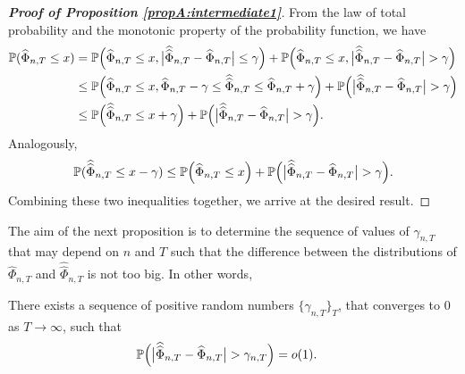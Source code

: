 \documentclass[a4paper,12pt]{article}
\newcommand{\doublehattwo}[1]{\widehat{\widehat{#1}}}
\begin{document}
\begin{proof}[\textnormal{\textbf{Proof of Proposition \ref{propA:intermediate1}}}] 
From the law of total probability and the monotonic property of the probability function, we have
\begin{align*} \pr(\widehat{\Phi}_{n, T} \le x) &= \pr \Big(\widehat{\Phi}_{n, T} \le x, \big|\doublehattwo{\Phi}_{n,T} - \widehat{\Phi}_{n,T}\big| \le \gamma \Big) + \pr \Big(\widehat{\Phi}_{n, T} \le x, \big|\doublehattwo{\Phi}_{n,T} - \widehat{\Phi}_{n,T}\big| > \gamma \Big) \\
& \le  \pr \Big(\widehat{\Phi}_{n, T} \le x, \widehat{\Phi}_{n,T} - \gamma \le \doublehattwo{\Phi}_{n,T} \le \widehat{\Phi}_{n,T} + \gamma \Big) + \pr \Big(\big|\doublehattwo{\Phi}_{n,T} - \widehat{\Phi}_{n,T}\big| > \gamma \Big) \\
& \le  \pr \Big(\doublehattwo{\Phi}_{n,T} \le x + \gamma \Big) + \pr \Big(\big|\doublehattwo{\Phi}_{n,T} - \widehat{\Phi}_{n,T}\big| > \gamma \Big).
\end{align*}
Analogously, 
\begin{align*} \pr(\doublehattwo{\Phi}_{n, T} \le x - \gamma)  \le  \pr \Big(\widehat{\Phi}_{n,T} \le x \Big) + \pr \Big(\big|\doublehattwo{\Phi}_{n,T} - \widehat{\Phi}_{n,T}\big| > \gamma \Big).
\end{align*}
Combining these two inequalities together, we arrive at the desired result.
\end{proof}

The aim of the next proposition is to determine the sequence of values of $\gamma_{n, T}$ that may depend on $n$ and $T$ such that the difference between the distributions of $\widehat{\Phi}_{n, T}$ and $\doublehattwo{\Phi}_{n, T}$ is not too big. In other words,

\begin{propA}\label{propA:intermediate2}
There exists a sequence of positive random numbers $\{\gamma_{n, T}\}_T$, that converges to $0$ as $T\to \infty$, such that
\begin{align}\label{eq-intermediate-relation-2}
\pr \Big(\big|\doublehattwo{\Phi}_{n,T} &- \widehat{\Phi}_{n,T}\big| > \gamma_{n, T} \Big) = o(1).
\end{align}
\end{propA}
\end{document}
